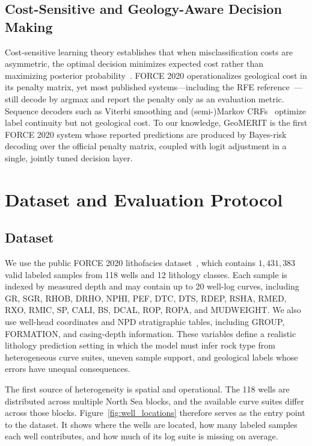 \documentclass[bdcc,article,submit,pdftex,moreauthors]{Definitions/mdpi}
\begin{document}
\subsection{Cost-Sensitive and Geology-Aware Decision Making}
Cost-sensitive learning theory establishes that when misclassification costs are asymmetric,
the optimal decision minimizes expected cost rather than maximizing posterior
probability~\cite{elkan2001cost,berger1985decision,andrade2019bayes,zadrozny2002multiclass}.
FORCE 2020 operationalizes geological cost in its penalty matrix, yet most published
systems---including the RFE reference~\cite{chen2026rfe}---still decode by argmax and report
the penalty only as an evaluation metric. Sequence decoders such as Viterbi smoothing and
(semi-)Markov CRFs~\cite{viterbi1967,lafferty2001crf,sarawagi2004semimarkov} optimize label
continuity but not geological cost. To our knowledge, GeoMERIT is the first FORCE 2020 system
whose reported predictions are produced by Bayes-risk decoding over the official penalty
matrix, coupled with logit adjustment in a single, jointly tuned decision layer.

\section{Dataset and Evaluation Protocol}
\label{sec:data}

\subsection{Dataset}
\label{sec:dataset}
We use the public FORCE 2020 lithofacies dataset~\cite{bormann2020force}, which contains
$1{,}431{,}383$ valid labeled samples from 118 wells and 12 lithology classes. Each sample is
indexed by measured depth and may contain up to 20 well-log curves, including GR, SGR, RHOB,
DRHO, NPHI, PEF, DTC, DTS, RDEP, RSHA, RMED, RXO, RMIC, SP, CALI, BS, DCAL, ROP, ROPA, and
MUDWEIGHT. We also use well-head coordinates and NPD stratigraphic tables, including GROUP,
FORMATION, and casing-depth information. These variables define a realistic lithology
prediction setting in which the model must infer rock type from heterogeneous curve suites,
uneven sample support, and geological labels whose errors have unequal consequences.

The first source of heterogeneity is spatial and operational. The 118 wells are distributed
across multiple North Sea blocks, and the available curve suites differ across those blocks.
Figure~\ref{fig:well_locations} therefore serves as the entry point to the dataset. It shows
where the wells are located, how many labeled samples each well contributes, and how much of
its log suite is missing on average.
\end{document}
